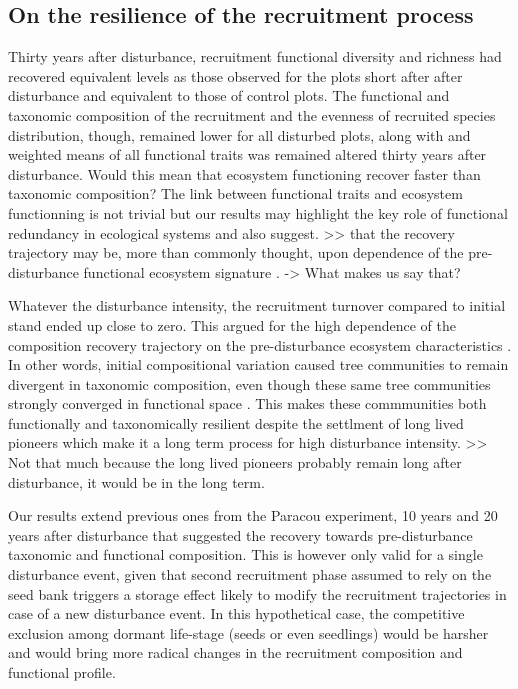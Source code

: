 \documentclass[fleqn,10pt]{ArtEcoFoG} %
\begin{document}
\subsection{On the resilience of the recruitment
process}\label{on-the-resilience-of-the-recruitment-process}

Thirty years after disturbance, recruitment functional diversity and
richness had recovered equivalent levels as those observed for the plots
short after after disturbance and equivalent to those of control plots.
The functional and taxonomic composition of the recruitment and the
evenness of recruited species distribution, though, remained lower for
all disturbed plots, along with and weighted means of all functional
traits was remained altered thirty years after disturbance. Would this
mean that ecosystem functioning recover faster than taxonomic
composition? The link between functional traits and ecosystem
functionning is not trivial but our results may highlight the key role
of functional redundancy in ecological systems and also suggest.
\textgreater{}\textgreater{} that the recovery trajectory may be, more
than commonly thought, upon dependence of the pre-disturbance functional
ecosystem signature \citep{Herault2018}. -\textgreater{} What makes us
say that?

Whatever the disturbance intensity, the recruitment turnover compared to
initial stand ended up close to zero. This argued for the high
dependence of the composition recovery trajectory on the pre-disturbance
ecosystem characteristics \citep{Anderson2007}. In other words, initial
compositional variation caused tree communities to remain divergent in
taxonomic composition, even though these same tree communities strongly
converged in functional space \citep{Fukami2005}. This makes these
commmunities both functionally and taxonomically resilient despite the
settlment of long lived pioneers which make it a long term process for
high disturbance intensity. \textgreater{}\textgreater{} Not that much
because the long lived pioneers probably remain long after disturbance,
it would be in the long term.

Our results extend previous ones from the Paracou experiment, 10 years
\citep{Molino2001} and 20 years \citep{Baraloto2012a} after disturbance
that suggested the recovery towards pre-disturbance taxonomic and
functional composition. This is however only valid for a single
disturbance event, given that second recruitment phase assumed to rely
on the seed bank triggers a storage effect likely to modify the
recruitment trajectories in case of a new disturbance event. In this
hypothetical case, the competitive exclusion among dormant life-stage
(seeds or even seedlings) would be harsher and would bring more radical
changes in the recruitment composition and functional profile.
\end{document}
